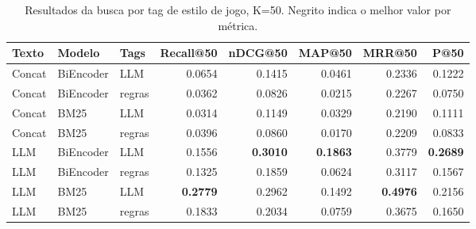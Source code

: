 \begin{table}[h]
\centering
\caption{Resultados da busca por tag de estilo de jogo, K=50. Negrito indica o melhor valor por métrica.}
\label{tab:tag-search-k50}
\begin{tabular}{lllrrrrr}
\toprule
Texto & Modelo & Tags & Recall@50 & nDCG@50 & MAP@50 & MRR@50 & P@50 \\
\midrule
Concat & BiEncoder & LLM & 0.0654 & 0.1415 & 0.0461 & 0.2336 & 0.1222 \\
Concat & BiEncoder & regras & 0.0362 & 0.0826 & 0.0215 & 0.2267 & 0.0750 \\
Concat & BM25 & LLM & 0.0314 & 0.1149 & 0.0329 & 0.2190 & 0.1111 \\
Concat & BM25 & regras & 0.0396 & 0.0860 & 0.0170 & 0.2209 & 0.0833 \\
LLM & BiEncoder & LLM & 0.1556 & \textbf{0.3010} & \textbf{0.1863} & 0.3779 & \textbf{0.2689} \\
LLM & BiEncoder & regras & 0.1325 & 0.1859 & 0.0624 & 0.3117 & 0.1567 \\
LLM & BM25 & LLM & \textbf{0.2779} & 0.2962 & 0.1492 & \textbf{0.4976} & 0.2156 \\
LLM & BM25 & regras & 0.1833 & 0.2034 & 0.0759 & 0.3675 & 0.1650 \\
\bottomrule
\end{tabular}
\end{table}
